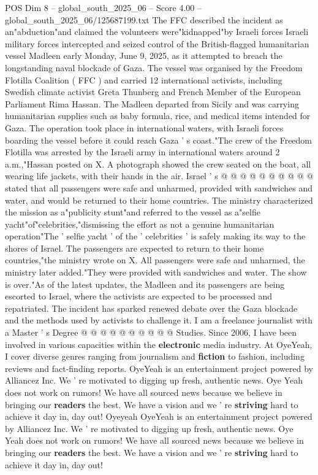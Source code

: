 \begin{textsample}{POS Dim 8 – global\_south\_2025\_06 – Score 4.00 – global\_south\_2025\_06/125687199.txt}  \label{ex:f8_pos_195}
The FFC described the incident as an"abduction"and claimed the volunteers were"kidnapped"by Israeli forces Israeli military forces intercepted and seized control of the British-flagged humanitarian vessel Madleen early Monday, June 9, 2025, as it attempted to breach the longstanding naval blockade of Gaza.
The vessel was organised by the Freedom Flotilla Coalition ( FFC ) and carried 12 international activists, including Swedish climate activist Greta Thunberg and French Member of the European Parliament Rima Hassan.
The Madleen departed from Sicily and was carrying humanitarian supplies such as baby formula, rice, and medical items intended for Gaza.
The operation took place in international waters, with Israeli forces boarding the vessel before it could reach Gaza ' s coast."The crew of the Freedom Flotilla was arrested by the Israeli army in international waters around 2 a.m.,"Hassan posted on X.
A photograph showed the crew seated on the boat, all wearing life jackets, with their hands in the air.
Israel ' s @ @ @ @ @ @ @ @ @ @ stated that all passengers were safe and unharmed, provided with sandwiches and water, and would be returned to their home countries.
The ministry characterized the mission as a"publicity stunt"and referred to the vessel as a"selfie yacht"of"celebrities,"dismissing the effort as not a genuine humanitarian operation"The ' selfie yacht ' of the ' celebrities ' is safely making its way to the shores of Israel.
The passengers are expected to return to their home countries,"the ministry wrote on X.
All passengers were safe and unharmed, the ministry later added."They were provided with sandwiches and water.
The show is over."As of the latest updates, the Madleen and its passengers are being escorted to Israel, where the activists are expected to be processed and repatriated.
The incident has sparked renewed debate over the Gaza blockade and the methods used by activists to challenge it.
I am a freelance journalist with a Master ' s Degree @ @ @ @ @ @ @ @ @ @ Studies.
Since 2006, I have been involved in various capacities within the \textbf{electronic} media industry.
At OyeYeah, I cover diverse genres ranging from journalism and \textbf{fiction} to fashion, including reviews and fact-finding reports.
OyeYeah is an entertainment project powered by Alliancez Inc.
We ' re motivated to digging up fresh, authentic news.
Oye Yeah does not work on rumors!
We have all sourced news because we believe in bringing our \textbf{readers} the best.
We have a vision and we ' re \textbf{striving} hard to achieve it day in, day out!
Oyeyeah OyeYeah is an entertainment project powered by Alliancez Inc.
We ' re motivated to digging up fresh, authentic news.
Oye Yeah does not work on rumors!
We have all sourced news because we believe in bringing our \textbf{readers} the best.
We have a vision and we ' re \textbf{striving} hard to achieve it day in, day out!

\end{textsample}
